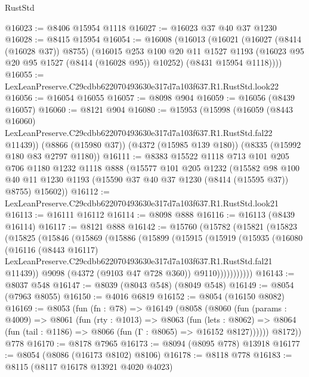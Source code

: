 \begin{lexlean}{RustStd}
\begin{coremodule}
@16023 := @8406 @15954 @1118
@16027 := @16023 @37 @40 @37 @1230
@16028 := @8415 @15954
@16054 := @16008
    (@16013
      (@16021
        (@16027 (@8414 (@16028 @37)) @8755)
        (@16015
          @253
          @100
          @20
          @11
          @1527
          @1193
          (@16023 @95 @20 @95 @1527 (@8414 (@16028 @95)) @10252)
          (@8431 @15954 @1118))))
@16055 := LexLeanPreserve.C29cdbb622070493630e317d7a103f637.R1.RustStd.look22
@16056 := @16054 @16055
@16057 := @8098 @904
@16059 := @16056 (@8439 @16057)
@16060 := @8121 @904
@16080 := @15953
    (@15998
      (@16059
        (@8443 @16060)
        LexLeanPreserve.C29cdbb622070493630e317d7a103f637.R1.RustStd.fal22
        @11439))
    (@8866 (@15980 @37))
    (@4372 (@15985 @139 @180))
    (@8335 (@15992 @180 @83 @2797 @1180))
@16111 := @8383
    @15522
    @1118
    @713
    @101
    @205
    @706
    @1180
    @1232
    @1118
    @888
    (@15577
      @101
      @205
      @1232
      (@15582
        @98
        @100
        @40
        @11
        @1230
        @1193
        (@15590 @37 @40 @37 @1230 (@8414 (@15595 @37)) @8755)
        @15602))
@16112 := LexLeanPreserve.C29cdbb622070493630e317d7a103f637.R1.RustStd.look21
@16113 := @16111 @16112
@16114 := @8098 @888
@16116 := @16113 (@8439 @16114)
@16117 := @8121 @888
@16142 := @15760
    (@15782
      (@15821
        (@15823
          (@15825
            (@15846
              (@15869
                (@15886
                  (@15899
                    (@15915
                      (@15919
                        (@15935
                          (@16080
                            (@16116
                              (@8443 @16117)
                              LexLeanPreserve.C29cdbb622070493630e317d7a103f637.R1.RustStd.fal21
                              @11439))
                          @9098
                          (@4372 (@9103 @47 @728 @360))
                          @9110)))))))))))
@16143 := @8037 @548
@16147 := @8039 (@8043 @548) (@8049 @548)
@16149 := @8054 (@7963 @8055)
@16150 := @4016 @6819
@16152 := @8054 (@16150 @8082)
@16169 := @8053
    (fun (fn : @78) =>
    @16149
      (@8058
        (@8060
          (fun (params : @4009) =>
          @8061
            (fun (rty : @1013) =>
            @8063
              (fun (lets : @8062) =>
              @8064 (fun (tail : @1186) => @8066 (fun (Γ : @8065) => @16152 @8127))))))
        @8172))
    @778
@16170 := @8178 @7965
@16173 := @8094 (@8095 @778) @13918
@16177 := @8054 (@8086 (@16173 @8102) @8106)
@16178 := @8118 @778
@16183 := @8115 (@8117 @16178 @13921 @4020 @4023)

\end{coremodule}
\end{lexlean}
